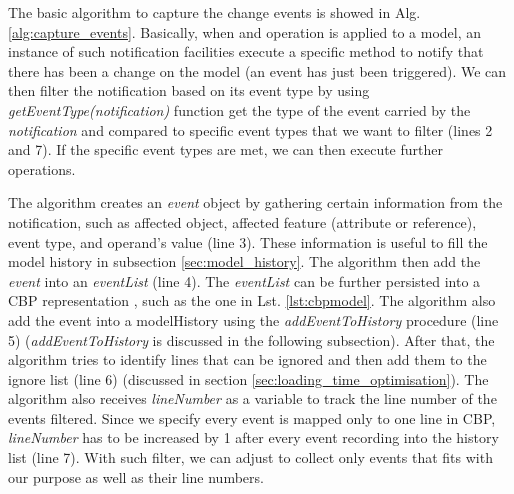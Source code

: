\documentclass{llncs}
\begin{document}
The basic algorithm to capture the change events is showed in Alg. \ref{alg:capture_events}. Basically, when and operation is applied to a model, an instance of such notification facilities execute a specific method to notify that there has been a change on the model (an event has just been triggered). We can then filter the notification based on its event type by using \emph{getEventType(notification)} function get the type of the event carried by the \emph{notification} and compared to specific event types that we want to filter (lines 2 and 7). If the specific event types are met, we can then execute further operations. 

The algorithm creates an \emph{event} object by gathering certain information from the notification, such as affected object, affected feature (attribute or reference), event type, and operand's value (line 3). These information is useful to fill the model history in subsection \ref{sec:model_history}. The algorithm then add the \emph{event} into an \emph{eventList} (line 4). The \emph{eventList} can be further persisted into a CBP representation  \cite{yohannis2017turning}, such as the one in Lst. \ref{lst:cbpmodel}. The algorithm also add the event into a modelHistory using the \emph{addEventToHistory} procedure (line 5) (\emph{addEventToHistory} is discussed in the following subsection). After that, the algorithm tries to identify lines that can be ignored and then add them to the ignore list (line 6) (discussed in section \ref{sec:loading_time_optimisation}). The algorithm also receives \emph{lineNumber} as a variable to track the line number of the events filtered. Since we specify every event is mapped only to one line in CBP, \emph{lineNumber} has to be increased by 1 after every event recording into the history list (line 7). With such filter, we can adjust to collect only events that fits with our purpose as well as their line numbers.
\end{document}
